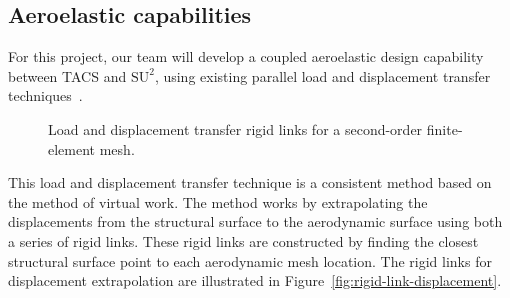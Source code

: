 \documentclass[12pt,headinclude,headsepline]{article}
\begin{document}
\subsection{Aeroelastic capabilities}

For this project, our team will develop a coupled aeroelastic design
capability between TACS and $\text{SU}^2$, using existing parallel
load and displacement transfer
techniques~\citep{Kennedy:2014:tacs-tripan}. 

\begin{figure}
  \centering
  \caption{Load and displacement transfer rigid links for a
    second-order finite-element mesh.}
\end{figure}

This load and displacement transfer technique is a consistent method
based on the method of virtual work. The method works by extrapolating
the displacements from the structural surface to the aerodynamic
surface using both a series of rigid links. These rigid links are
constructed by finding the closest structural surface point to each
aerodynamic mesh location. The rigid links for displacement
extrapolation are illustrated in
Figure~\ref{fig:rigid-link-displacement}.
\end{document}
